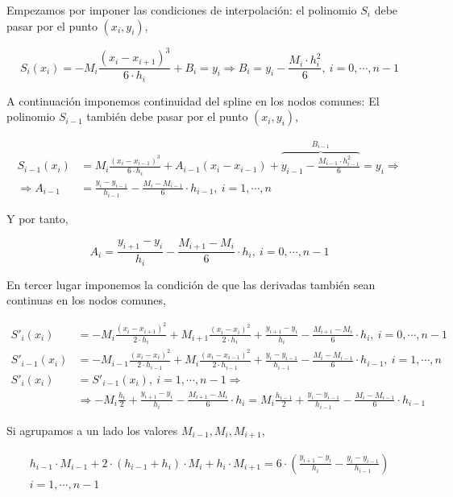 Empezamos por imponer las condiciones de interpolación: el polinomio $S_i$ debe pasar por el punto $(x_i,y_i)$,

\begin{equation*}
S_i(x_i)=-M_i\frac{(x_i-x_{i+1})^3}{6\cdot h_i}+B_i=y_i \Rightarrow B_i=y_i-\frac{M_i\cdot h_i^2}{6},\ i=0,\cdots, n-1
\end{equation*}

A continuación imponemos continuidad del spline en los nodos comunes: El polinomio $S_{i-1}$ también debe pasar por el punto $(x_i, y_i)$,

\begin{align*}
S_{i-1}(x_i)&=M_i\frac{(x_i-x_{i-1})^3}{6\cdot h_i}+A_{i-1}(x_i-x_{i-1})+\overbrace{y_{i-1}-\frac{M_{i-1}\cdot h_{i-1}^2}{6}}^{B_{i-1}}=y_i \Rightarrow\\
\Rightarrow A_{i-1}&=\frac{y_i-y_{i-1}}{h_{i-1}}-\frac{M_i-M_{i-1}}{6}\cdot h_{i-1}, \ i=1,\cdots, n
\end{align*}

Y por tanto,

\begin{equation*}
A_i=\frac{y_{i+1}-y_i}{h_i}-\frac{M_{i+1}-M_i}{6}\cdot h_i, \ i=0,\cdots, n-1
\end{equation*}

En tercer lugar imponemos la condición de que las derivadas también sean continuas en los nodos comunes,

\begin{align*}
S'_i(x_i)&=-M_i\frac{(x_i-x_{i+1})^2}{2\cdot h_i}+M_{i+1}\frac{(x_i-x_i)^2}{2\cdot h_i}+\frac{y_{i+1}-y_i}{h_i}-\frac{M_{i+1}-M_i}{6}\cdot h_i,\   i=0,\cdots, n-1\\
S'_{i-1}(x_i)&=-M_{i-1}\frac{(x_i-x_i)^2}{2\cdot h_{i-1}}+M_{i}\frac{(x_i-x_{i-1})^2}{2\cdot h_{i-1 }}+\frac{y_i-y_{i-1}}{h_{i-1}}-\frac{M_i-M_{i-1}}{6}\cdot h_{i-1},\   i=1,\cdots, n\\
S'_i(x_i)&=S'_{i-1}(x_i) ,\   i=1,\cdots, n-1 \Rightarrow\\
&\Rightarrow -M_i\frac{h_i}{2}+\frac{y_{i+1}-y_i}{h_i}-\frac{M_{i+1}-M_i}{6}\cdot h_i=M_{i}\frac{h_{i-1}}{2}+\frac{y_i-y_{i-1}}{h_{i-1}}-\frac{M_i-M_{i-1}}{6}\cdot h_{i-1}
\end{align*}

Si agrupamos a un lado los valores $M_{i-1}, M_i, M_{i+1}$,

\begin{align*}
h_{i-1}\cdot M_{i-1}+2\cdot (h_{i-1}+h_i)\cdot M_i+h_i\cdot M_{i+1}=6\cdot \left(\frac{y_{i+1}-y_i}{h_i}-\frac{y_i-y_{i-1}}{h_{i-1}}\right)\\
i=1,\cdots ,n-1
\end{align*}

